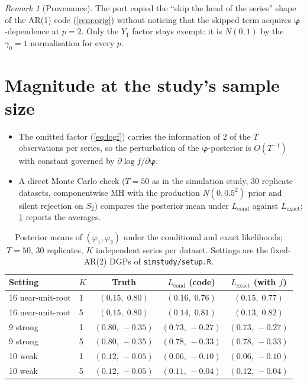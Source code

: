 \documentclass[11pt]{article}
\newcommand{\eref}[1]{(\ref{#1})}
\newcommand{\Lexact}{L_{\mathrm{exact}}}
\newcommand{\Lcond}{L_{\mathrm{cond}}}
\newcommand{\bphi}{\boldsymbol{\varphi}}
\theoremstyle{plain}
\theoremstyle{definition}
\theoremstyle{remark}
\newtheorem{remark}[proposition]{Remark}
\begin{document}
\begin{remark}[Provenance]\label{rem:port}
The port copied the ``skip the head of the series'' shape of the AR(1) code
(\cref{rem:orig}) without noticing that the skipped term acquires
$\bphi$-dependence at $p = 2$. Only the $Y_1$ factor stays exempt: it is
$N(0, 1)$ by the $\gamma_0 = 1$ normalisation for every $p$.
\end{remark}

\section{Magnitude at the study's sample size}\label{sec:magnitude}

\begin{itemize}
  \item The omitted factor \eref{eq:logf} carries the information of $2$ of
        the $T$ observations per series, so the perturbation of the
        $\bphi$-posterior is $O(T^{-1})$ with constant governed by
        $\partial \log f / \partial \bphi$.
  \item A direct Monte Carlo check ($T = 50$ as in the simulation study,
        $30$ replicate datasets, componentwise MH with the production
        $N(0, 0.5^2)$ prior and silent rejection on $S_2$) compares the
        posterior mean under $\Lcond$ against $\Lexact$;
        \cref{tab:bias} reports the averages.
\end{itemize}

\begin{table}[ht]
\centering
\caption{Posterior means of $(\varphi_1, \varphi_2)$ under the conditional
         and exact likelihoods; $T = 50$, $30$ replicates, $K$ independent
         series per dataset. Settings are the fixed-AR(2) DGPs of
         \texttt{simstudy/setup.R}.}
\label{tab:bias}
\begin{tabular}{llccc}
\toprule
Setting & $K$ & Truth & $\Lcond$ (code) & $\Lexact$ (with $f$) \\
\midrule
16 near-unit-root & 1 & $(0.15,\; 0.80)$  & $(0.16,\; 0.76)$  & $(0.15,\; 0.77)$ \\
16 near-unit-root & 5 & $(0.15,\; 0.80)$  & $(0.14,\; 0.81)$  & $(0.13,\; 0.82)$ \\
9 strong          & 1 & $(0.80,\, -0.35)$ & $(0.73,\, -0.27)$ & $(0.73,\, -0.27)$ \\
9 strong          & 5 & $(0.80,\, -0.35)$ & $(0.78,\, -0.33)$ & $(0.78,\, -0.33)$ \\
10 weak           & 1 & $(0.12,\, -0.05)$ & $(0.06,\, -0.10)$ & $(0.06,\, -0.10)$ \\
10 weak           & 5 & $(0.12,\, -0.05)$ & $(0.11,\, -0.04)$ & $(0.12,\, -0.04)$ \\
\bottomrule
\end{tabular}
\end{table}
\end{document}
